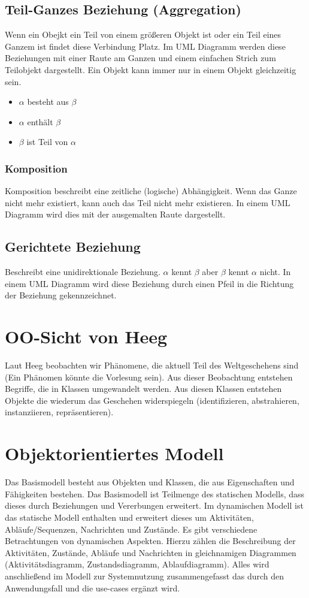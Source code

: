 \subsection{Teil-Ganzes Beziehung (Aggregation)}
Wenn ein Obejkt ein Teil von einem größeren Objekt ist oder ein Teil eines Ganzem ist findet diese Verbindung Platz. Im UML Diagramm werden diese Beziehungen mit einer Raute am Ganzen und einem einfachen Strich zum Teilobjekt dargestellt. Ein Objekt kann immer nur in einem Objekt gleichzeitig sein.
\begin{itemize}
	\item $ \alpha $ besteht aus  $ \beta $
	\item $ \alpha $ enthält $ \beta $
	\item $ \beta $ ist Teil von  $ \alpha $
\end{itemize}

\subsubsection{Komposition}
Komposition beschreibt eine zeitliche (logische) Abhängigkeit. Wenn das Ganze nicht mehr existiert, kann auch das Teil nicht mehr existieren. In einem UML Diagramm wird dies mit der ausgemalten Raute dargestellt.

\subsection{Gerichtete Beziehung}
Beschreibt eine unidirektionale Beziehung. $ \alpha $ kennt $ \beta $ aber $ \beta $ kennt $ \alpha $ nicht. In einem UML Diagramm wird diese Beziehung durch einen Pfeil in die Richtung der Beziehung gekennzeichnet.

\section{OO-Sicht von Heeg}
Laut Heeg beobachten wir Phänomene, die aktuell Teil des Weltgeschehens sind (Ein Phänomen könnte die Vorlesung sein). Aus dieser Beobachtung entstehen Begriffe, die in Klassen umgewandelt werden. Aus diesen Klassen entstehen Objekte die wiederum das Geschehen widerspiegeln (identifizieren, abstrahieren, instanziieren, repräsentieren).

\section{Objektorientiertes Modell}
Das Basismodell besteht aus Objekten und Klassen, die aus Eigenschaften und Fähigkeiten bestehen. Das Basismodell ist Teilmenge des statischen Modells, dass dieses durch Beziehungen und Vererbungen erweitert. Im dynamischen Modell ist das statische Modell enthalten und erweitert dieses um Aktivitäten, Abläufe/Sequenzen, Nachrichten und Zustände. Es gibt verschiedene Betrachtungen von dynamischen Aspekten. Hierzu zählen die Beschreibung der Aktivitäten, Zustände, Abläufe und Nachrichten in gleichnamigen Diagrammen (Aktivitätsdiagramm, Zustandsdiagramm, Ablaufdiagramm). Alles wird anschließend im Modell zur Systemnutzung zusammengefasst das durch den Anwendungsfall und die use-cases ergänzt wird.

